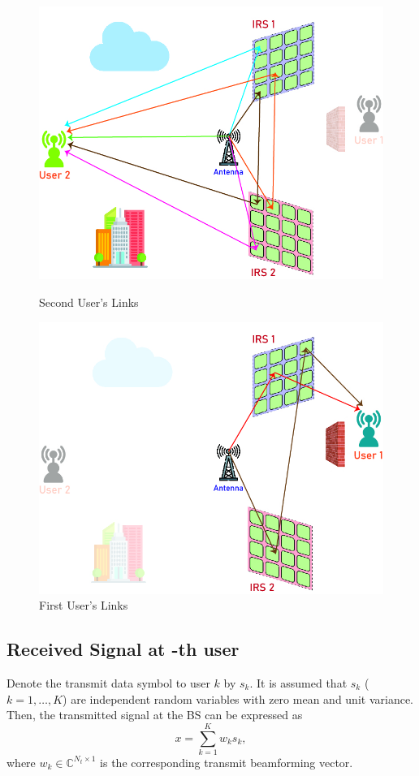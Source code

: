 \documentclass{article}
\begin{document}
\begin{figure}[!h]
	\centering
	\begin{minipage}{.5\textwidth}
		\flushleft
		\includegraphics[width=0.9\linewidth]{with_obstacle__user2}
		\caption{Second User's Links}
	\end{minipage}%
	\vline
	\begin{minipage}{.5\textwidth}
		\flushright			
		\includegraphics[width=0.9\linewidth]{with_obstacle__user1}
		\caption{First User's Links}
	\end{minipage}
\end{figure}

\subsection{Received Signal at -th user}
Denote the transmit data symbol to user $k$ by $s_k$. It is assumed that $s_k$ ($k = 1, \ldots, K$) are independent random variables with zero mean and unit variance. Then, the transmitted signal at the BS can be expressed as
\begin{equation}
	x = \sum_{k=1}^{K} w_k s_k, \label{eq:transmitted_signal}
\end{equation}
where $w_k \in \mathbb{C}^{N_t \times 1}$ is the corresponding transmit beamforming vector.
\end{document}
